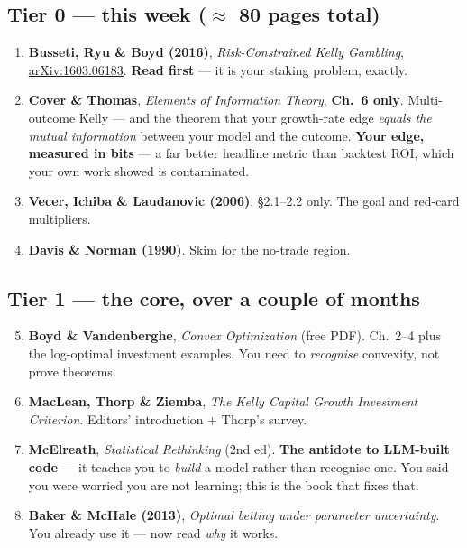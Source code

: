 \documentclass[11pt,a4paper]{article}
\begin{document}
\subsection*{Tier 0 --- this week ($\approx$ 80 pages total)}
\begin{enumerate}
\item \textbf{Busseti, Ryu \& Boyd (2016)}, \emph{Risk-Constrained Kelly Gambling},
      \href{https://arxiv.org/abs/1603.06183}{arXiv:1603.06183}. \textbf{Read first} --- it is your staking
      problem, exactly.
\item \textbf{Cover \& Thomas}, \emph{Elements of Information Theory}, \textbf{Ch.\ 6 only}. Multi-outcome
      Kelly --- and the theorem that your growth-rate edge \emph{equals the mutual information} between your
      model and the outcome. \textbf{Your edge, measured in bits} --- a far better headline metric than
      backtest ROI, which your own work showed is contaminated.
\item \textbf{Vecer, Ichiba \& Laudanovic (2006)}, \S2.1--2.2 only. The goal and red-card multipliers.
\item \textbf{Davis \& Norman (1990)}. Skim for the no-trade region.
\end{enumerate}

\subsection*{Tier 1 --- the core, over a couple of months}
\begin{enumerate}\setcounter{enumi}{4}
\item \textbf{Boyd \& Vandenberghe}, \emph{Convex Optimization} (free PDF). Ch.\ 2--4 plus the log-optimal
      investment examples. You need to \emph{recognise} convexity, not prove theorems.
\item \textbf{MacLean, Thorp \& Ziemba}, \emph{The Kelly Capital Growth Investment Criterion}. Editors'
      introduction + Thorp's survey.
\item \textbf{McElreath}, \emph{Statistical Rethinking} (2nd ed). \textbf{The antidote to LLM-built code} ---
      it teaches you to \emph{build} a model rather than recognise one. You said you were worried you are not
      learning; this is the book that fixes that.
\item \textbf{Baker \& McHale (2013)}, \emph{Optimal betting under parameter uncertainty}. You already use it
      --- now read \emph{why} it works.
\end{enumerate}
\end{document}
